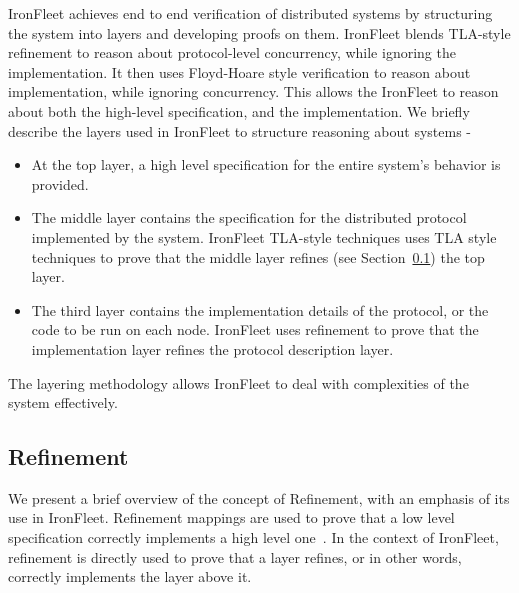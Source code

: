 \documentclass{llncs}
\begin{document}
IronFleet achieves end to end verification of distributed systems by structuring the system into layers and 
developing proofs on them. IronFleet blends TLA-style refinement to reason about protocol-level concurrency, 
while ignoring the implementation. It then uses Floyd-Hoare style verification to reason about implementation,
while ignoring concurrency. This allows the IronFleet to reason about both the high-level specification, and
the implementation. We briefly describe the layers used in IronFleet to structure reasoning about systems - 
\begin{itemize}
\item At the top layer, a high level specification for the entire system's behavior is provided. 
\item The middle layer contains the specification for the distributed protocol implemented by the
    system. IronFleet TLA-style techniques uses TLA style techniques to prove that the middle layer 
    refines (see Section~\ref{sec:refinement}) the top layer.
\item The third layer contains the implementation details of the protocol, or the code to be run on each node.
    IronFleet uses refinement to prove that the implementation layer refines the protocol description layer. 
\end{itemize}

The layering methodology allows IronFleet to deal with complexities of the system effectively. 

\subsection{Refinement}\label{sec:refinement}
We present a brief overview of the concept of Refinement, with an emphasis of its use in
IronFleet. Refinement mappings are used to prove that a low level specification correctly
implements a high level one~\cite{Abadi}. In the context of IronFleet, refinement is directly 
used to prove that a layer refines, or in other words, correctly implements the layer above it.
\end{document}
